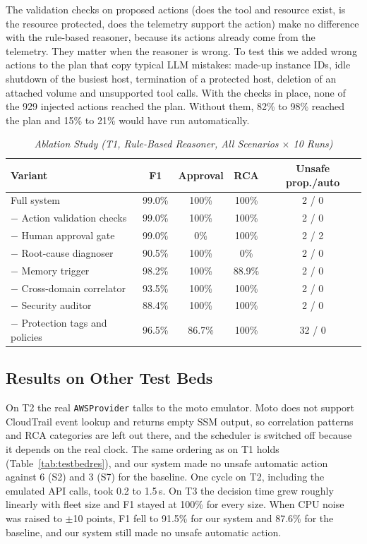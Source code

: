 \documentclass{ieeeaccess}
\begin{document}
The validation checks on proposed actions (does the tool and resource exist,
is the resource protected, does the telemetry support the action) make no
difference with the rule-based reasoner, because its actions already come
from the telemetry. They matter when the reasoner is wrong. To test this we
added wrong actions to the plan that copy typical LLM mistakes: made-up
instance IDs, idle shutdown of the busiest host, termination of a protected
host, deletion of an attached volume and unsupported tool calls. With the
checks in place, none of the 929 injected actions reached the plan. Without
them, 82\% to 98\% reached the plan and 15\% to 21\% would have run
automatically.

\begin{table}[ht]
\caption{\textit{Ablation Study (T1, Rule-Based Reasoner, All Scenarios $\times$ 10 Runs)}}
\centering
\setlength{\tabcolsep}{2pt}
\begin{tabular}{lcccc}
\toprule
\textbf{Variant} & \textbf{F1} & \textbf{Approval} & \textbf{RCA} & \textbf{Unsafe prop./auto} \\
\midrule
Full system                          & 99.0\% & 100\%  & 100\%  & 2 / 0 \\
$-$ Action validation checks         & 99.0\% & 100\%  & 100\%  & 2 / 0 \\
$-$ Human approval gate              & 99.0\% & 0\%    & 100\%  & 2 / 2 \\
$-$ Root-cause diagnoser             & 90.5\% & 100\%  & 0\%    & 2 / 0 \\
$-$ Memory trigger                   & 98.2\% & 100\%  & 88.9\% & 2 / 0 \\
$-$ Cross-domain correlator          & 93.5\% & 100\%  & 100\%  & 2 / 0 \\
$-$ Security auditor                 & 88.4\% & 100\%  & 100\%  & 2 / 0 \\
$-$ Protection tags and policies     & 96.5\% & 86.7\% & 100\%  & 32 / 0 \\
\bottomrule
\end{tabular}
\label{tab:ablation}
\end{table}

\subsection{Results on Other Test Beds}

On T2 the real \texttt{AWSProvider} talks to the moto emulator. Moto does not
support CloudTrail event lookup and returns empty SSM output, so correlation
patterns and RCA categories are left out there, and the scheduler is switched
off because it depends on the real clock. The same ordering as on T1 holds
(Table~\ref{tab:testbedres}), and our system made no unsafe automatic action
against 6 (S2) and 3 (S7) for the baseline. One cycle on T2, including the
emulated API calls, took 0.2 to 1.5\,s. On T3 the decision time grew roughly
linearly with fleet size and F1 stayed at 100\% for every size. When CPU noise
was raised to $\pm$10 points, F1 fell to 91.5\% for our system and 87.6\% for
the baseline, and our system still made no unsafe automatic action.
\end{document}
